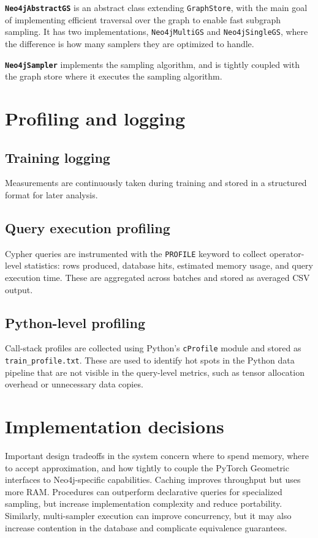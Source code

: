 \documentclass[PhD,single]{uclathes}
\begin{document}
\noindent \textbf{\texttt{Neo4jAbstractGS}} is an abstract class extending
\texttt{GraphStore}, with the main goal of implementing efficient traversal
over the graph to enable fast subgraph sampling. It has two implementations,
\texttt{Neo4jMultiGS} and \texttt{Neo4jSingleGS}, where the difference is how
many samplers they are optimized to handle.

\noindent \textbf{\texttt{Neo4jSampler}} implements the sampling algorithm,
and is tightly coupled with the graph store where it executes the sampling
algorithm.

\section{Profiling and logging}
\subsection{Training logging}
Measurements are continuously taken during training and stored in a structured
format for later analysis.

\subsection{Query execution profiling}\label{sec:query_profiling}
Cypher queries are instrumented with the \texttt{PROFILE} keyword to collect
operator-level statistics: rows produced, database hits, estimated memory
usage, and query execution time. These are aggregated across batches and stored
as averaged CSV output.

\subsection{Python-level profiling}\label{sec:python_profiling}
Call-stack profiles are collected using Python's \texttt{cProfile} module and
stored as \texttt{train\_profile.txt}. These are used to identify hot spots in
the Python data pipeline that are not visible in the query-level metrics, such
as tensor allocation overhead or unnecessary data copies.

\section{Implementation decisions}
Important design tradeoffs in the system concern where to spend memory, where
to accept approximation, and how tightly to couple the PyTorch Geometric
interfaces to Neo4j-specific capabilities. Caching improves throughput but uses
more RAM. Procedures can outperform declarative queries for specialized
sampling, but increase implementation complexity and reduce portability.
Similarly, multi-sampler execution can improve concurrency, but it may also
increase contention in the database and complicate equivalence guarantees.
\end{document}
